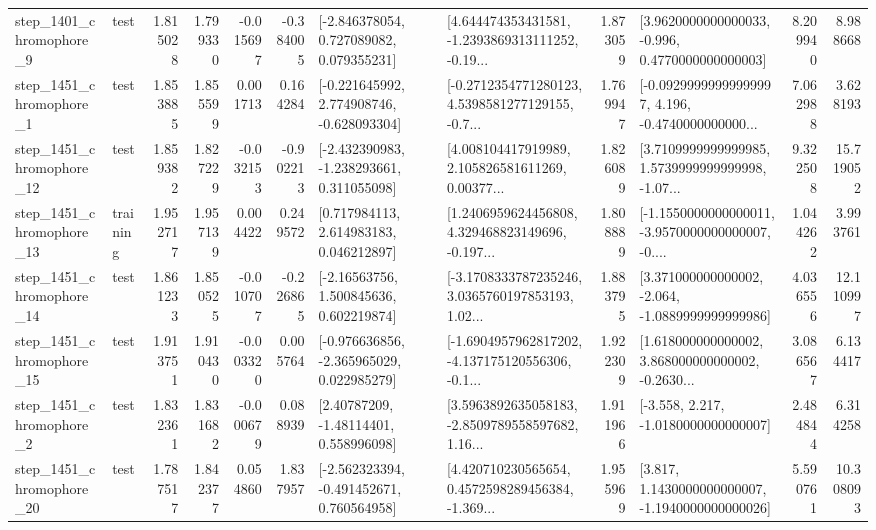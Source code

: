 \begin{tabular}{llrrrrllrlrr}
  step\_1401\_chromophore\_9 &      test &      1.815028 &    1.799330 &     -0.015697 & -0.384005 &    [-2.846378054, 0.727089082, 0.079355231] &  [4.644474353431581, -1.2393869313111252, -0.19... &       1.873059 &   [3.9620000000000033, -0.996, 0.4770000000000003] &            8.209940 &          8.988668 \\
  step\_1451\_chromophore\_1 &      test &      1.853885 &    1.855599 &      0.001713 &  0.164284 &   [-0.221645992, 2.774908746, -0.628093304] &  [-0.2712354771280123, 4.5398581277129155, -0.7... &       1.769947 &  [-0.09299999999999997, 4.196, -0.4740000000000... &            7.062988 &          3.628193 \\
 step\_1451\_chromophore\_12 &      test &      1.859382 &    1.827229 &     -0.032153 & -0.902213 &   [-2.432390983, -1.238293661, 0.311055098] &  [4.008104417919989, 2.105826581611269, 0.00377... &       1.826089 &  [3.7109999999999985, 1.5739999999999998, -1.07... &            9.322508 &         15.719052 \\
 step\_1451\_chromophore\_13 &  training &      1.952717 &    1.957139 &      0.004422 &  0.249572 &     [0.717984113, 2.614983183, 0.046212897] &  [1.2406959624456808, 4.329468823149696, -0.197... &       1.808889 &  [-1.1550000000000011, -3.9570000000000007, -0.... &            1.044262 &          3.993761 \\
 step\_1451\_chromophore\_14 &      test &      1.861233 &    1.850525 &     -0.010707 & -0.226865 &     [-2.16563756, 1.500845636, 0.602219874] &  [-3.1708333787235246, 3.0365760197853193, 1.02... &       1.883795 &   [3.371000000000002, -2.064, -1.0889999999999986] &            4.036556 &         12.110997 \\
 step\_1451\_chromophore\_15 &      test &      1.913751 &    1.910430 &     -0.003320 &  0.005764 &   [-0.976636856, -2.365965029, 0.022985279] &  [-1.6904957962817202, -4.137175120556306, -0.1... &       1.922309 &  [1.618000000000002, 3.868000000000002, -0.2630... &            3.086567 &          6.134417 \\
  step\_1451\_chromophore\_2 &      test &      1.832361 &    1.831682 &     -0.000679 &  0.088939 &      [2.40787209, -1.48114401, 0.558996098] &  [3.5963892635058183, -2.8509789558597682, 1.16... &       1.911966 &               [-3.558, 2.217, -1.0180000000000007] &            2.484844 &          6.314258 \\
 step\_1451\_chromophore\_20 &      test &      1.787517 &    1.842377 &      0.054860 &  1.837957 &   [-2.562323394, -0.491452671, 0.760564958] &  [4.420710230565654, 0.4572598289456384, -1.369... &       1.955969 &   [3.817, 1.1430000000000007, -1.1940000000000026] &            5.590761 &         10.308093 \\

\end{tabular}
